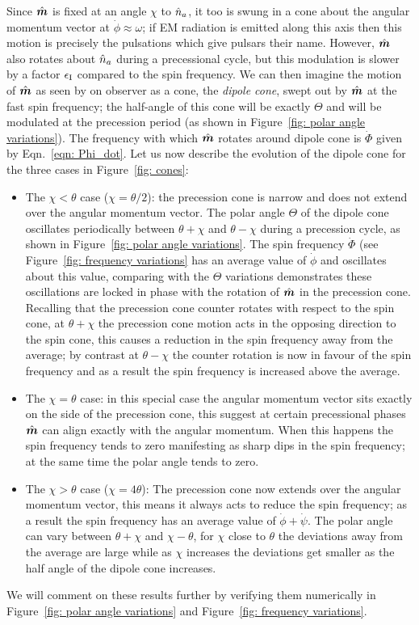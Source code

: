 \documentclass[../full_thesis/full_thesis.tex]{subfiles}
\begin{document}
Since $\hat{\boldsymbol{m}}$ is fixed at an angle $\chi$ to $\hat{n}_a$, it too is swung in a cone
about the angular momentum vector at $\dot{\phi}\approx \omega$; if EM
radiation is emitted along this axis then this motion is precisely the
pulsations which give pulsars their name.  However, $\hat{\boldsymbol{m}}$ also rotates about
$\hat{n}_a$ during a precessional cycle, but this modulation is slower by a factor
$\epsilon_{\mathrm{I}}$ compared to the spin frequency. We can then imagine the motion of $\hat{\boldsymbol{m}}$
as seen by on observer as a cone, the \emph{dipole cone}, swept out by $\hat{\boldsymbol{m}}$ at
the fast spin frequency; the half-angle of this cone will be exactly $\Theta$
and will be modulated at the precession period (as shown in Figure~\ref{fig:
polar angle variations}).  The frequency with which $\hat{\boldsymbol{m}}$ rotates around dipole
cone is $\dot{\Phi}$ given by Eqn.~\eqref{eqn: Phi_dot}. Let us now describe
the evolution of the dipole cone for the three cases in Figure~\ref{fig: cones}:
\begin{itemize}
\item The $\chi < \theta$ case ($\chi = \theta/2$): the precession cone is
narrow and does not extend over the angular momentum vector. The polar angle
$\Theta$ of the dipole cone oscillates periodically between $\theta+\chi$ and
$\theta-\chi$ during a precession cycle, as shown in Figure~\ref{fig: polar angle
variations}.  The spin frequency $\dot{\Phi}$ (see Figure~\ref{fig: frequency
variations} has an average value of $\dot{\phi}$ and oscillates about this
value, comparing with the $\Theta$ variations demonstrates these oscillations
are locked in phase with the rotation of $\hat{\boldsymbol{m}}$ in the precession cone. Recalling
that the precession cone counter rotates with respect to the spin cone, at
$\theta+\chi$ the precession cone motion acts in the opposing direction to the
spin cone, this causes a reduction in the spin frequency away from the average;
by contrast at $\theta-\chi$ the counter rotation is now in favour of the spin
frequency and as a result the spin frequency is increased above the average.

\item The $\chi = \theta$ case: in this special case the angular momentum vector sits exactly
on the side of the precession cone, this suggest at certain precessional phases $\hat{\boldsymbol{m}}$ can align exactly with
the angular momentum. When this happens the spin frequency tends to zero manifesting as sharp dips in the
spin frequency; at the same time the polar angle tends to zero.

\item The $\chi > \theta$ case ($\chi = 4\theta$): The precession cone now extends over the
angular momentum vector, this means it always acts to reduce the spin
frequency; as a result the spin frequency has an average value of
$\dot{\phi} + \dot{\psi}$. The polar angle can vary between $\theta+\chi$ and
$\chi-\theta$, for $\chi$ close to $\theta$ the deviations away from the
average are large while as $\chi$ increases the deviations get smaller as
the half angle of the dipole cone increases.
\end{itemize}
We will comment on these results further by verifying them numerically in
Figure~\ref{fig: polar angle variations} and Figure~\ref{fig: frequency variations}.
\end{document}
